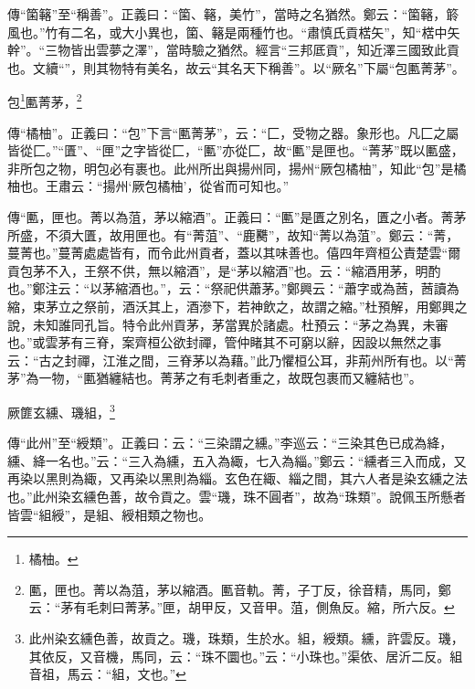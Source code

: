 {\noindent\zhuan{}\fzbyks 傳“箘簵”至“稱善”。正義曰：“箘、簵，美竹”，當時之名猶然。鄭云：“箘簵，䉁風也。”竹有二名，或大小異也，箘、簵是兩種竹也。“肅慎氏貢楛矢”，知“楛中矢幹”。“三物皆出雲夢之澤”，當時驗之猶然。經言“三邦厎貢”，知近澤三國致此貢也。文續“”，則其物特有美名，故云“其名天下稱善”。以“厥名”下屬“包匭菁茅”。 \par}

包\footnote{橘柚。}匭菁茅，\footnote{匭，匣也。菁以為菹，茅以縮酒。匭音軌。菁，子丁反，徐音精，馬同，鄭云：“茅有毛刺曰菁茅。”匣，胡甲反，又音甲。菹，側魚反。縮，所六反。}

{\noindent\zhuan{}\fzbyks 傳“橘柚”。正義曰：“包”下言“匭菁茅”，云：“匚，受物之器。象形也。凡匚之屬皆從匚。”“匱”、“匣”之字皆從匚，“匭”亦從匚，故“匭”是匣也。“菁茅”既以匭盛，非所包之物，明包必有裹也。此州所出與揚州同，揚州“厥包橘柚”，知此“包”是橘柚也。王肅云：“揚州‘厥包橘柚’，從省而可知也。” \par}

{\noindent\zhuan{}\fzbyks 傳“匭，匣也。菁以為菹，茅以縮酒”。正義曰：“匭”是匱之別名，匱之小者。菁茅所盛，不須大匱，故用匣也。有“菁菹”、“鹿臡”，故知“菁以為菹”。鄭云：“菁，蔓菁也。”蔓菁處處皆有，而令此州貢者，蓋以其味善也。僖四年齊桓公責楚雲“爾貢包茅不入，王祭不供，無以縮酒”，是“茅以縮酒”也。云：“縮酒用茅，明酌也。”鄭注云：“以茅縮酒也。”，云：“祭祀供蕭茅。”鄭興云：“蕭字或為莤，莤讀為縮，束茅立之祭前，酒沃其上，酒滲下，若神飲之，故謂之縮。”杜預解，用鄭興之說，未知誰同孔旨。特令此州貢茅，茅當異於諸處。杜預云：“茅之為異，未審也。”或雲茅有三脊，案齊桓公欲封禪，管仲睹其不可窮以辭，因設以無然之事云：“古之封禪，江淮之間，三脊茅以為藉。”此乃懼桓公耳，非荊州所有也。以“菁茅”為一物，“匭猶纏結也。菁茅之有毛刺者重之，故既包裹而又纏結也”。 \par}

厥篚玄纁、璣組，\footnote{此州染玄纁色善，故貢之。璣，珠類，生於水。組，綬類。纁，許雲反。璣，其依反，又音機，馬同，云：“珠不圜也。”云：“小珠也。”渠依、居沂二反。組音祖，馬云：“組，文也。”}

{\noindent\zhuan{}\fzbyks 傳“此州”至“綬類”。正義曰：云：“三染謂之纁。”李巡云：“三染其色已成為絳，纁、絳一名也。”云：“三入為纁，五入為緅，七入為緇。”鄭云：“纁者三入而成，又再染以黑則為緅，又再染以黑則為緇。玄色在緅、緇之間，其六人者是染玄纁之法也。”此州染玄纁色善，故令貢之。雲“璣，珠不圓者”，故為“珠類”。說佩玉所懸者皆雲“組綬”，是組、綬相類之物也。 \par}

